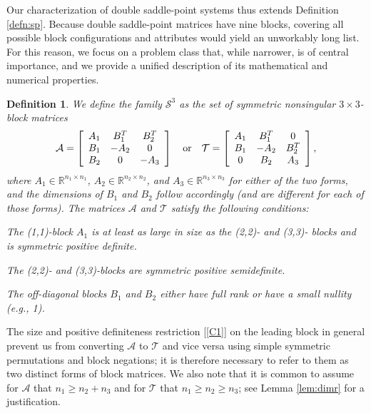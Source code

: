 \documentclass{article}
\newtheorem{definition}{Definition}
\newcommand{\st}{\mathcal{S}^3}
\newcommand{\sA}{\mathcal{A}}
\newcommand{\sT}{\mathcal{T}}
\begin{document}
Our characterization of double saddle-point systems thus extends Definition \ref{defn:sp}. 
Because double saddle-point matrices have nine blocks, covering all possible block configurations and attributes would yield an unworkably long list. For this reason, we focus on a problem class that, while narrower, is of central importance, and we provide a  unified description of its mathematical and numerical properties.


 \begin{definition}
We define the family $\st$  as the set of symmetric nonsingular $3 \times 3$-block matrices 
\begin{equation}
\label{eq:2sp}
   \sA = \left[ \begin{array}{ccc}
    A_1 & B_1^T & B_2^T \\
    B_1 & -A_2 & 0 \\
    B_2 & 0 & -A_3
    \end{array} \right] 
\quad {\rm or} \quad
    \sT = \left[ \begin{array}{ccc}
    A_1 & B_1^T & 0 \\
    B_1 & -A_2 & B_2^T \\
    0 & B_2 & A_3
    \end{array}\right],
\end{equation}
where $A_1 \in {\mathbb R}^{n_1 \times n_1}$, $A_2 \in {\mathbb R}^{n_2 \times n_2}$, and $A_3 \in {\mathbb R}^{n_3 \times n_3}$ for either of the two forms, and  the dimensions of $B_1$ and $B_2$ follow accordingly (and are different for each of those forms). The matrices $\sA$  and $\sT$ satisfy the following conditions:
\begin{enumerate}[label={[C\arabic*]}]
    \item \label{[C1]} The (1,1)-block $A_1$ is at least as large in size as the (2,2)- and (3,3)- blocks and is symmetric positive definite.
    \item \label{[C2]} The (2,2)- and (3,3)-blocks are symmetric positive semidefinite.
    \item \label{[C3]}The off-diagonal blocks $B_1$ and $B_2$ either have full rank or have a small nullity (e.g., 1).
\end{enumerate}
\label{defn:dsp}
\end{definition}

The size and positive definiteness restriction \ref{[C1]} on the leading block in general  prevent us from converting $\sA$ to $\sT$ and vice versa using simple symmetric permutations and block negations; it is therefore necessary to refer to them as two distinct forms of block matrices. We also note that it is common to assume for $\sA$ that $n_1 \ge n_2+n_3$ and for $\sT$ that $n_1 \ge n_2 \ge n_3$; see Lemma \ref{lem:dimr} for a justification.\textbf{}
\end{document}
